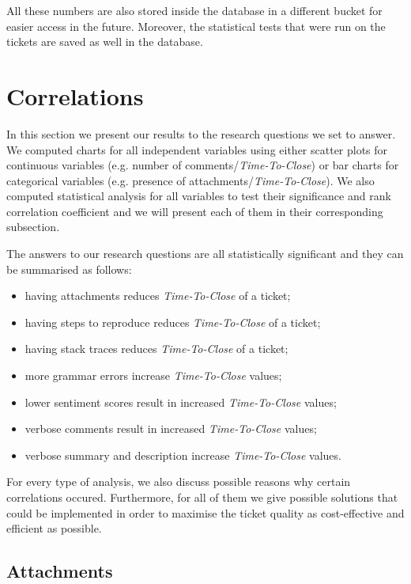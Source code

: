 \documentclass{mpaper}
\begin{document}
All these numbers are also stored inside the database in a different bucket for easier access in the future. Moreover, the statistical 
tests that were run on the tickets are saved as well in the database.

\section{Correlations}\label{correlations}

In this section we present our results to the research questions we set to answer. We computed charts for all 
independent variables using either scatter plots for continuous variables (e.g. number of comments/\emph{Time-To-Close}) 
or bar charts for categorical variables (e.g. presence of attachments/\emph{Time-To-Close}). We also computed statistical analysis for 
all variables to test their significance and rank correlation coefficient and we will present each of them in their 
corresponding subsection. 

The answers to our research questions are all statistically significant and they can be summarised as follows:
\begin{itemize}
  \item having attachments reduces \emph{Time-To-Close} of a ticket;
  \item having steps to reproduce reduces \emph{Time-To-Close} of a ticket;
  \item having stack traces reduces \emph{Time-To-Close} of a ticket;
  \item more grammar errors increase \emph{Time-To-Close} values;
  \item lower sentiment scores result in increased \emph{Time-To-Close} values;
  \item verbose comments result in increased \emph{Time-To-Close} values;
  \item verbose summary and description increase \emph{Time-To-Close} values.
\end{itemize}

For every type of analysis, we also discuss possible reasons why certain correlations occured. Furthermore, for all 
of them we give possible solutions that could be implemented in order to maximise the ticket quality as cost-effective 
and efficient as possible.

\vskip30pt

\subsection{Attachments}
\end{document}
